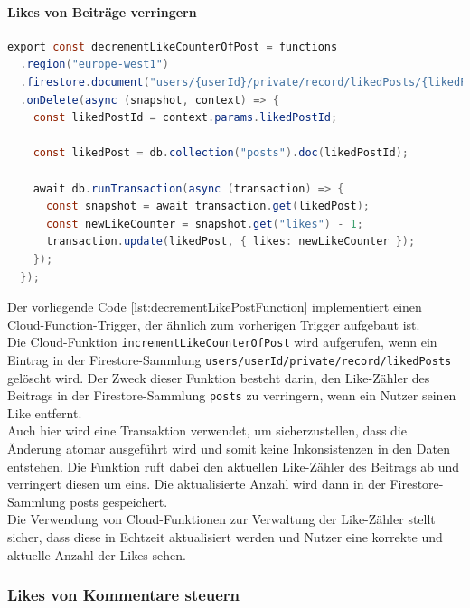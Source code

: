 \paragraph{Likes von Beiträge verringern}

\begin{lstlisting}[language=Java,caption=decrementLikeCounterOfPost Funktion,label=lst:decrementLikePostFunction]
  export const decrementLikeCounterOfPost = functions
  .region("europe-west1")
  .firestore.document("users/{userId}/private/record/likedPosts/{likedPostId}")
  .onDelete(async (snapshot, context) => {
    const likedPostId = context.params.likedPostId;

    const likedPost = db.collection("posts").doc(likedPostId);

    await db.runTransaction(async (transaction) => {
      const snapshot = await transaction.get(likedPost);
      const newLikeCounter = snapshot.get("likes") - 1;
      transaction.update(likedPost, { likes: newLikeCounter });
    });
  });
\end{lstlisting}

Der vorliegende Code \ref{lst:decrementLikePostFunction} implementiert einen Cloud-Function-Trigger, der ähnlich zum vorherigen Trigger aufgebaut ist.
\\
Die Cloud-Funktion \texttt{incrementLikeCounterOfPost} wird aufgerufen, wenn ein Eintrag in der Firestore-Sammlung \texttt{users/{userId}/private/record/likedPosts} gelöscht wird. Der Zweck dieser Funktion besteht darin, den Like-Zähler des Beitrags in der Firestore-Sammlung \texttt{posts} zu verringern, wenn ein Nutzer seinen Like entfernt.
\\
Auch hier wird eine Transaktion verwendet, um sicherzustellen, dass die Änderung atomar ausgeführt wird und somit keine Inkonsistenzen in den Daten entstehen. Die Funktion ruft dabei den aktuellen Like-Zähler des Beitrags ab und verringert diesen um eins. Die aktualisierte Anzahl wird dann in der Firestore-Sammlung posts gespeichert.
\\
Die Verwendung von Cloud-Funktionen zur Verwaltung der Like-Zähler stellt sicher, dass diese in Echtzeit aktualisiert werden und Nutzer eine korrekte und aktuelle Anzahl der Likes sehen.

\subsubsection{Likes von Kommentare steuern}


